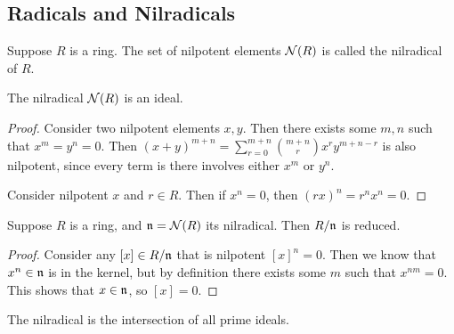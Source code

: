 \subsection*{Radicals and Nilradicals}

\begin{definition}
    Suppose \(R\) is a ring.
    The set of nilpotent elements \(\operatorname{\mathcal{N}}(R)\) is called the nilradical of \(R\).
\end{definition}
\begin{lemma}
    The nilradical \(\operatorname{\mathcal{N}}(R)\) is an ideal.
\end{lemma}
\begin{proof}
    Consider two nilpotent elements \(x,y\).
    Then there exists some \(m,n\) such that \(x^m = y^n = 0\).
    Then \({(x+y)}^{m+n} = \sum_{r=0}^{m+n} \binom{m+n}{r} x^r y^{m+n-r}\) is also nilpotent,
    since every term is there involves either \(x^m\) or \(y^n\).

    Consider nilpotent \(x\) and \(r \in R\).
    Then if \(x^n = 0\), then \({(rx)}^n = r^n x^n = 0\).
\end{proof}
\begin{theorem}
    Suppose \(R\) is a ring, and \(\mathfrak{n} = \operatorname{\mathcal{N}}(R)\) its nilradical.
    Then \(R/\mathfrak{n}\) is reduced.
\end{theorem}
\begin{proof}
    Consider any \([x] \in R/\mathfrak{n}\) that is nilpotent \({[x]}^n = 0\).
    Then we know that \(x^n \in \mathfrak{n}\) is in the kernel,
    but by definition there exists some \(m\) such that \(x^{nm} = 0\).
    This shows that \(x \in \mathfrak{n}\), so \([x] = 0\).
\end{proof}
\begin{theorem}\label{thm:nilradical-intersection-prime}
    The nilradical is the intersection of all prime ideals.
\end{theorem}
